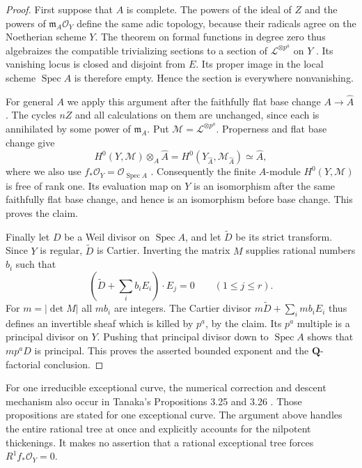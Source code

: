 \begin{proof}
First suppose that $A$ is complete.  The powers of the ideal of $Z$
and the powers of $\mathfrak m_A\mathcal O_Y$ define the same adic
topology, because their radicals agree on the Noetherian scheme $Y$.
The theorem on formal functions in degree zero thus algebraizes the
compatible trivializing sections to a section of
$\mathcal L^{\otimes p^a}$ on $Y$
\cite[Theorem 30.20.5, tag 02OC]{C_StacksFormalPic}.
Its vanishing locus is closed and disjoint from $E$.
Its proper image in the local scheme $\operatorname{Spec}A$ is
therefore empty.  Hence the section is everywhere nonvanishing.

For general $A$ we apply this argument after the faithfully flat
base change $A\to\widehat A$.  The cycles $nZ$ and all calculations
on them are unchanged, since each is annihilated by some power of
$\mathfrak m_A$.  Put $\mathcal M=\mathcal L^{\otimes p^a}$.
Properness and flat base change give
\[
 H^0(Y,\mathcal M)\otimes_A\widehat A
   =H^0(Y_{\widehat A},\mathcal M_{\widehat A})\simeq\widehat A,
\]
where we also use $f_*\mathcal O_Y=\mathcal O_{\operatorname{Spec}A}$
\cite[Lemma 30.5.2, tag 02KH]{C_StacksFormalPic}.
Consequently the finite $A$-module $H^0(Y,\mathcal M)$ is free of
rank one.  Its evaluation map on $Y$ is an isomorphism after the same
faithfully flat base change, and hence is an isomorphism before base
change.  This proves the claim.

Finally let $D$ be a Weil divisor on $\operatorname{Spec}A$, and
let $\widetilde D$ be its strict transform.  Since $Y$ is regular,
$\widetilde D$ is Cartier.  Inverting the matrix $M$ supplies rational
numbers $b_i$ such that
\[
 \left(\widetilde D+\sum_i b_iE_i\right)\cdot E_j=0
 \qquad(1\leq j\leq r).
\]
For $m=|\det M|$ all $mb_i$ are integers.  The Cartier divisor
$m\widetilde D+\sum_i mb_iE_i$ thus defines an invertible sheaf
which is killed by $p^a$, by the claim.  Its $p^a$ multiple is a
principal divisor on $Y$.  Pushing that principal divisor down to
$\operatorname{Spec}A$ shows that $mp^aD$ is principal.  This proves
the asserted bounded exponent and the $\mathbf Q$-factorial conclusion.
\end{proof}

\begin{remark}
For one irreducible exceptional curve, the numerical correction and
descent mechanism also occur in Tanaka's Propositions 3.25 and 3.26
\cite[pp. 23--24]{C_Tanaka2014}.  Those propositions are stated for
one exceptional curve.  The argument above handles the entire rational
tree at once and explicitly accounts for the nilpotent thickenings.
It makes no assertion that a rational exceptional tree forces
$R^1f_*\mathcal O_Y=0$.
\end{remark}
